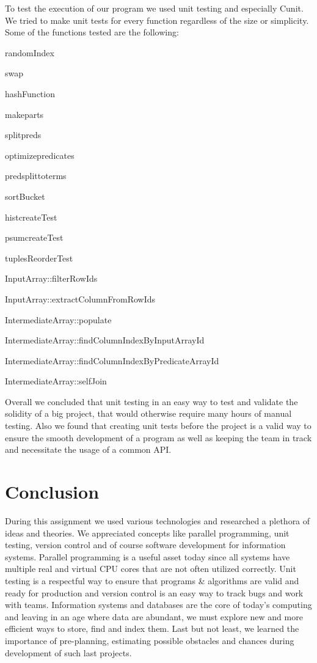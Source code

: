 \documentclass{ws-ijprai}
\begin{document}
\tab To test the execution of our program we used unit testing and especially Cunit. We tried to make unit tests for every function regardless of the size or simplicity. Some of the functions tested are the following: 
\begin{itemlist}
\item randomIndex
\item swap
\item hashFunction
\item makeparts
\item splitpreds
\item optimizepredicates
\item predsplittoterms
\item sortBucket
\item histcreateTest
\item psumcreateTest
\item tuplesReorderTest
\item InputArray::filterRowIds
\item InputArray::extractColumnFromRowIds
\item IntermediateArray::populate
\item IntermediateArray::findColumnIndexByInputArrayId
\item IntermediateArray::findColumnIndexByPredicateArrayId
\item IntermediateArray::selfJoin
\end{itemlist}
\tab Overall we concluded that unit testing in an easy way to test and validate the solidity of a big project, that would otherwise require many hours of manual testing. Also we found that creating unit tests before the project is a valid way to ensure the smooth development of a program as well as keeping the team in track and necessitate the usage of a common API.

\section{Conclusion}

\tab During this assignment we used various technologies and researched a plethora of ideas and theories. We appreciated concepts like parallel programming, unit testing, version control and of course software development for information systems. Parallel programming is a useful asset today since all systems have multiple real and virtual CPU cores that are not often utilized correctly. Unit testing is a respectful way to ensure that programs \& algorithms are valid and ready for production and version control is an easy way to track bugs and work with teams. Information systems and databases are the core of today's computing and leaving in an age where data are abundant, we must explore new and more efficient ways to store, find and index them. Last but not least, we learned the importance of pre-planning, estimating possible obstacles and chances during development of such last projects.
\end{document}
